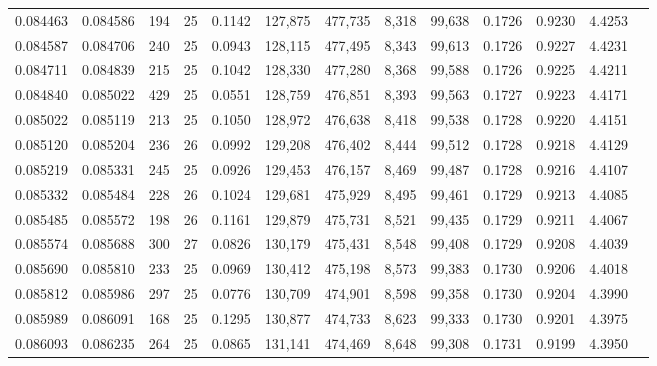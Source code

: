 \begin{tabular}{rrrrrrrrrrrrr}
0.084463 & 0.084586 & 194 &  25 &                                     0.1142 & 127,875 & 477,735 &   8,318 &  99,638 & 0.1726 & 0.9230 & 4.4253 \\
0.084587 & 0.084706 & 240 &  25 &                                     0.0943 & 128,115 & 477,495 &   8,343 &  99,613 & 0.1726 & 0.9227 & 4.4231 \\
0.084711 & 0.084839 & 215 &  25 &                                     0.1042 & 128,330 & 477,280 &   8,368 &  99,588 & 0.1726 & 0.9225 & 4.4211 \\
0.084840 & 0.085022 & 429 &  25 &                                     0.0551 & 128,759 & 476,851 &   8,393 &  99,563 & 0.1727 & 0.9223 & 4.4171 \\
0.085022 & 0.085119 & 213 &  25 &                                     0.1050 & 128,972 & 476,638 &   8,418 &  99,538 & 0.1728 & 0.9220 & 4.4151 \\
0.085120 & 0.085204 & 236 &  26 &                                     0.0992 & 129,208 & 476,402 &   8,444 &  99,512 & 0.1728 & 0.9218 & 4.4129 \\
0.085219 & 0.085331 & 245 &  25 &                                     0.0926 & 129,453 & 476,157 &   8,469 &  99,487 & 0.1728 & 0.9216 & 4.4107 \\
0.085332 & 0.085484 & 228 &  26 &                                     0.1024 & 129,681 & 475,929 &   8,495 &  99,461 & 0.1729 & 0.9213 & 4.4085 \\
0.085485 & 0.085572 & 198 &  26 &                                     0.1161 & 129,879 & 475,731 &   8,521 &  99,435 & 0.1729 & 0.9211 & 4.4067 \\
0.085574 & 0.085688 & 300 &  27 &                                     0.0826 & 130,179 & 475,431 &   8,548 &  99,408 & 0.1729 & 0.9208 & 4.4039 \\
0.085690 & 0.085810 & 233 &  25 &                                     0.0969 & 130,412 & 475,198 &   8,573 &  99,383 & 0.1730 & 0.9206 & 4.4018 \\
0.085812 & 0.085986 & 297 &  25 &                                     0.0776 & 130,709 & 474,901 &   8,598 &  99,358 & 0.1730 & 0.9204 & 4.3990 \\
0.085989 & 0.086091 & 168 &  25 &                                     0.1295 & 130,877 & 474,733 &   8,623 &  99,333 & 0.1730 & 0.9201 & 4.3975 \\
0.086093 & 0.086235 & 264 &  25 &                                     0.0865 & 131,141 & 474,469 &   8,648 &  99,308 & 0.1731 & 0.9199 & 4.3950 \\

\end{tabular}
